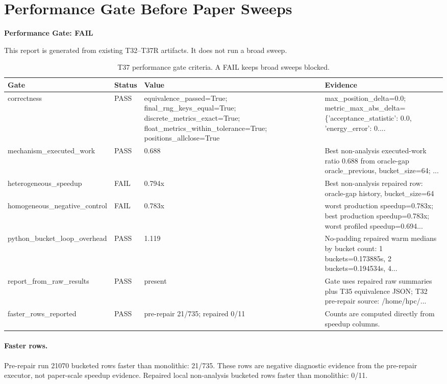 \section*{Performance Gate Before Paper Sweeps}
\textbf{Performance Gate: FAIL}

This report is generated from existing T32--T37R artifacts. It does not run a broad sweep.

\begin{table}[htbp]
\centering
\caption{T37 performance gate criteria. A FAIL keeps broad sweeps blocked.}
\begin{tabular}{llll}
\hline
Gate & Status & Value & Evidence \\
\hline
correctness & PASS & equivalence\_passed=True; final\_rng\_keys\_equal=True; discrete\_metrics\_exact=True; float\_metrics\_within\_tolerance=True; positions\_allclose=True & max\_position\_delta=0.0; metric\_max\_abs\_delta=\{'acceptance\_statistic': 0.0, 'energy\_error': 0.... \\
mechanism\_executed\_work & PASS & 0.688 & Best non-analysis executed-work ratio 0.688 from oracle-gap oracle\_previous, bucket\_size=64; ... \\
heterogeneous\_speedup & FAIL & 0.794x & Best non-analysis repaired row: oracle-gap history, bucket\_size=64 \\
homogeneous\_negative\_control & FAIL & 0.783x & worst production speedup=0.783x; best production speedup=0.783x; worst profiled speedup=0.694... \\
python\_bucket\_loop\_overhead & PASS & 1.119 & No-padding repaired warm medians by bucket count: 1 buckets=0.173885s, 2 buckets=0.194534s, 4... \\
report\_from\_raw\_results & PASS & present & Gate uses repaired raw summaries plus T35 equivalence JSON; T32 pre-repair source: /home/hpc/... \\
faster\_rows\_reported & PASS & pre-repair 21/735; repaired 0/11 & Counts are computed directly from speedup columns. \\
\hline
\end{tabular}
\end{table}

\paragraph{Faster rows.}
Pre-repair run 21070 bucketed rows faster than monolithic: 21/735. These rows are negative diagnostic evidence from the pre-repair executor, not paper-scale speedup evidence.
Repaired local non-analysis bucketed rows faster than monolithic: 0/11.

